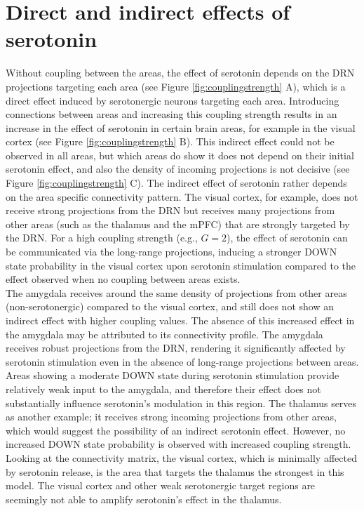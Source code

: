 \section{Direct and indirect effects of serotonin\label{sec:indirecteffects}}
\noindent
\indent Without coupling between the areas, the effect of serotonin depends on the DRN projections targeting each area (see Figure \ref{fig:couplingstrength} A), which is a direct effect induced by serotonergic neurons targeting each area. Introducing connections between areas and increasing this coupling strength results in an increase in the effect of serotonin in certain brain areas, for example in the visual cortex (see Figure \ref{fig:couplingstrength} B). 
This indirect effect could not be observed in all areas, but which areas do show it does not depend on their initial serotonin effect, and also the density of incoming projections is not decisive (see Figure \ref{fig:couplingstrength} C). The indirect effect of serotonin rather depends on the area specific connectivity pattern. The visual cortex, for example, does not receive strong projections from the DRN but receives many projections from other areas (such as the thalamus and the mPFC) that are strongly targeted by the DRN. For a high coupling strength (e.g., $G=2$), the effect of serotonin can be communicated via the long-range projections, inducing a stronger DOWN state probability in the visual cortex upon serotonin stimulation compared to the effect observed when no coupling between areas exists.
\\
\indent The amygdala receives around the same density of projections from other areas (non-serotonergic) compared to the visual cortex, and still does not show an indirect effect with higher coupling values. The absence of this increased effect in the amygdala may be attributed to its connectivity profile. The amygdala receives robust projections from the DRN, rendering it significantly affected by serotonin stimulation even in the absence of long-range projections between areas. Areas showing a moderate DOWN state during serotonin stimulation provide relatively weak input to the amygdala, and therefore their effect does not substantially influence serotonin's modulation in this region. The thalamus serves as another example; it receives strong incoming projections from other areas, which would suggest the possibility of an indirect serotonin effect. However, no increased DOWN state probability is observed with increased coupling strength. Looking at the connectivity matrix, the visual cortex, which is minimally affected by serotonin release, is the area that targets the thalamus the strongest in this model. The visual cortex and other weak serotonergic target regions are seemingly not able to amplify serotonin’s effect in the thalamus.
